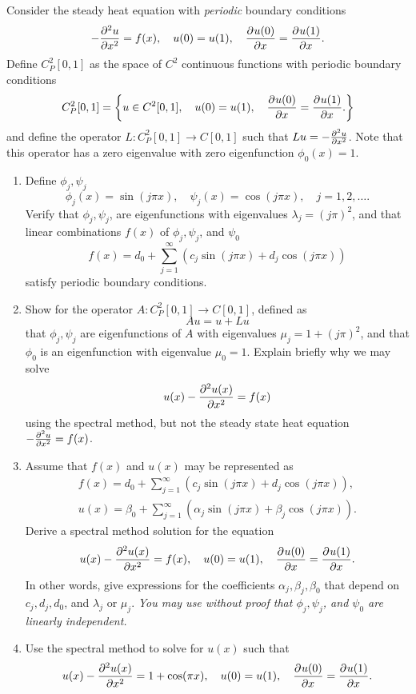 Consider the steady heat equation with \emph{periodic} boundary conditions
\[
-\frac{\partial^{2} u}{\partial x^{2}} = f(x), \quad u(0) = u(1), \quad \frac{\partial^{} u(0)}{\partial x^{}} = \frac{\partial^{} u(1)}{\partial x^{}}.
\]
Define $C^2_P[0,1]$ as the space of $C^2$ continuous functions with periodic boundary conditions
\[
C^2_P[0,1] = \left\{ 
u\in C^2[0,1], \quad u(0) = u(1), \quad \frac{\partial^{} u(0)}{\partial x^{}} = \frac{\partial^{} u(1)}{\partial x^{}}.
\right\}
\]
and define the operator $L:C^2_P[0,1]\rightarrow C[0,1]$ such that $Lu = -\frac{\partial^{2} u}{\partial x^{2}}$. Note that this operator has a zero eigenvalue with zero eigenfunction $\phi_0(x) = 1$. 

\begin{enumerate}
\item Define $\phi_j, \psi_j$ 
\[
\phi_j(x) = \sin(j\pi x), \quad \psi_j(x) = \cos(j\pi x), \quad j = 1,2,\ldots.
\]
Verify that $\phi_j,\psi_j$, are eigenfunctions with eigenvalues $\lambda_j = (j\pi)^2$, and that linear combinations $f(x)$ of $\phi_j,\psi_j$, and $\psi_0$
\[
f(x) = d_0 + \sum_{j = 1}^\infty \left( c_j \sin(j\pi x) + d_j \cos(j\pi x)\right)
\]
satisfy periodic boundary conditions.
\item Show for the operator $A:C^2_P[0,1]\rightarrow C[0,1]$, defined as
\[
Au = u + Lu
\]
that $\phi_j, \psi_j$ are eigenfunctions of $A$ with eigenvalues $\mu_j = 1 + (j\pi)^2$, and that $\phi_0$ is an eigenfunction with eigenvalue $\mu_0 = 1$.  Explain briefly why we may solve 
\[
u(x) - \frac{\partial^{2} u(x)}{\partial x^{2}} = f(x)
\]
using the spectral method, but not the steady state heat equation $-\frac{\partial^{2} u}{\partial x^{2}} = f(x)$.
\item Assume that $f(x)$ and $u(x)$ may be represented as
\begin{align*}
f(x) = d_0 + \sum_{j = 1}^\infty \left( c_j \sin(j\pi x) + d_j \cos(j\pi x)\right),\\
u(x) = \beta_0 + \sum_{j=1}^\infty \left( \alpha_j \sin(j\pi x) + \beta_j \cos(j\pi x) \right).
\end{align*}
Derive a spectral method solution for the equation
\[
u(x) - \frac{\partial^{2} u(x)}{\partial x^{2}} = f(x), \quad u(0) = u(1), \quad \frac{\partial^{} u(0)}{\partial x^{}} = \frac{\partial^{} u(1)}{\partial x^{}}.
\]
In other words, give expressions for the coefficients $\alpha_j,\beta_j, \beta_0$ that depend on $c_j, d_j, d_0$, and $\lambda_j$ or $\mu_j$.  \emph{You may use without proof that $\phi_j, \psi_j$, and $\psi_0$ are linearly independent.}%
\item Use the spectral method to solve for $u(x)$ such that
\[
u(x) - \frac{\partial^{2} u(x)}{\partial x^{2}} = 1 + \cos(\pi x), \quad u(0) = u(1), \quad \frac{\partial^{} u(0)}{\partial x^{}} = \frac{\partial^{} u(1)}{\partial x^{}}.
\]
\end{enumerate}
